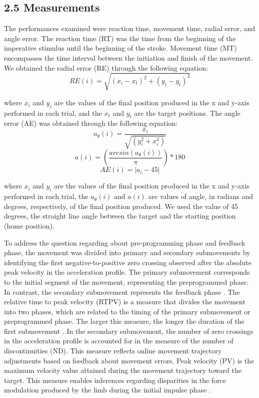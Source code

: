 \documentclass[man,a4paper,12pt,floatsintext]{apa6}
\begin{document}
	
\subsection{2.5 Measurements}

The performances examined were reaction time, movement time, radial error, and angle error. The reaction time (RT) was the time from the beginning of the imperative stimulus until the beginning of the stroke. Movement time (MT) encompasses the time interval between the initiation and finish of the movement. We obtained the radial error (RE) through the following equation:
\[ 
RE(i) = \sqrt{(x_i-x_t)^2+(y_i-y_t)^2} 
\]

where $x_i$ and $y_i$ are the values of the final position produced in the x and y-axis performed in each trial, and the $x_t$ and $y_t$ are the target positions. The angle error (AE) was obtained through the following equation:
\[ 
a_\theta (i) = \dfrac{x_i}{\sqrt{(y_i^2+x_i^2)}}
\]
\[
a(i) = (\dfrac{arcsin(a_\theta(i))}{\pi})*180 
\]
\[
AE (i) = |a_i-45|
\]

where $x_i$ and $y_i$ are the values of the final position produced in the x and y-axis performed in each trial,  the $a_\theta (i)$ and $a(i)$ are values of angle, in radians and degrees, respectively, of the final position produced. We used the value of 45 degrees, the straight line angle between the target and the starting position (home position). 

To address the question regarding about pre-programming phase and feedback phase, the movement was divided into primary and secondary submovements by identifying the first negative-to-positive zero crossing observed after the absolute peak velocity in the acceleration profile. The primary submovement corresponds to the initial segment of the movement, representing the preprogrammed phase. In contrast, the secondary submovement represents the feedback phase \citep{Elliott2010d}. The relative time to peak velocity (RTPV) is a measure that divides the movement into two phases, which are related to the timing of the primary submovement or preprogrammed phase. The larger this measure, the longer the duration of the first submovement \citep{Lage2013b}. In the secondary submovement, the number of zero crossings in the acceleration profile is accounted for in the measure of the number of discontinuities (ND). This measure reflects online movement trajectory adjustments based on feedback about movement errors. Peak velocity (PV) is the maximum velocity value attained during the movement trajectory toward the target. This measure enables inferences regarding disparities in the force modulation produced by the limb during the initial impulse phase \citep{Lage2014b}. 
\end{document}
